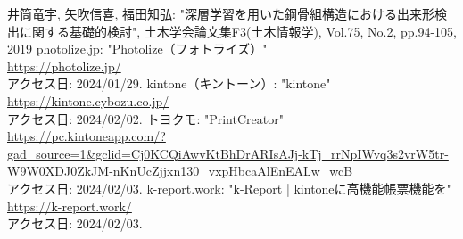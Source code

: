 \documentclass[uplatex, report, a4j, 10pt]{jsbook}
\begin{document}
\begin{thebibliography}{0}
  井筒竜宇, 矢吹信喜, 福田知弘: "深層学習を用いた鋼骨組構造における出来形検出に関する基礎的検討", 土木学会論文集F3(土木情報学), Vol.75, No.2, pp.94-105, 2019
  photolize.jp: "Photolize（フォトライズ）"\\\url{https://photolize.jp/}\\アクセス日: 2024/01/29.
  kintone（キントーン）: "kintone"\\\url{https://kintone.cybozu.co.jp/}\\アクセス日: 2024/02/02.
  トヨクモ: "PrintCreator"\\\url{https://pc.kintoneapp.com/?gad_source=1&gclid=Cj0KCQiAwvKtBhDrARIsAJj-kTj_rrNpIWvq3s2vrW5tr-W9W0XDJ0ZkJM-nKnUcZjjxn130_vxpHbcaAlEnEALw_wcB}\\アクセス日: 2024/02/03.
  k-report.work: "k-Report | kintoneに高機能帳票機能を"\\\url{https://k-report.work/}\\アクセス日: 2024/02/03.
\end{thebibliography}

\end{document}
